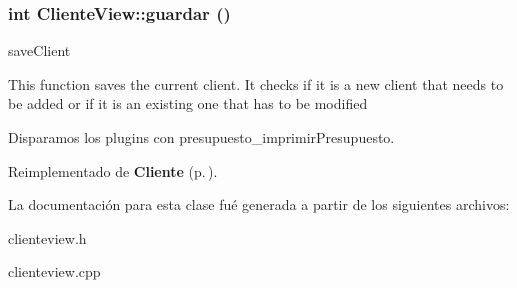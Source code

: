 \subsubsection{\setlength{\rightskip}{0pt plus 5cm}int Cliente\-View::guardar ()\hspace{0.3cm}{\tt  [virtual]}}\label{classClienteView_a5}


save\-Client

This function saves the current client. It checks if it is a new client that needs to be added or if it is an existing one that has to be modified

Disparamos los plugins con presupuesto\_\-imprimir\-Presupuesto. 

Reimplementado de {\bf Cliente} {\rm (p.\,\pageref{classCliente})}.

La documentaci\'{o}n para esta clase fu\'{e} generada a partir de los siguientes archivos:\begin{CompactItemize}
\item 
clienteview.h\item 
clienteview.cpp\end{CompactItemize}
